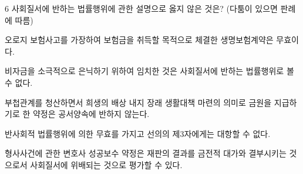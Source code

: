 \begin{question}{6}
사회질서에 반하는 법률행위에 관한 설명으로 옳지 않은 것은? (다툼이 있으면 판례에 따름)
\begin{choices}
  \item 오로지 보험사고를 가장하여 보험금을 취득할 목적으로 체결한 생명보험계약은 무효이다.
  \item 비자금을 소극적으로 은닉하기 위하여 임치한 것은 사회질서에 반하는 법률행위로 볼 수 없다.
  \item 부첩관계를 청산하면서 희생의 배상 내지 장래 생활대책 마련의 의미로 금원을 지급하기로 한 약정은 공서양속에 반하지 않는다.
  \item 반사회적 법률행위에 의한 무효를 가지고 선의의 제3자에게는 대항할 수 없다.
  \item 형사사건에 관한 변호사 성공보수 약정은 재판의 결과를 금전적 대가와 결부시키는 것으로서 사회질서에 위배되는 것으로 평가할 수 있다.
\end{choices}
\end{question}
